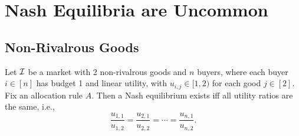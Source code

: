 \section{Nash Equilibria are Uncommon}
\label{sec:nasheq-uncommon}

\subsection{Non-Rivalrous Goods}
\label{sec:nasheq-uncommon:non-rival}

\begin{theorem}
\label{thm:nasheq-uncommon}
Let $\mathcal{I}$ be a market with 2 non-rivalrous goods and $n$ buyers, where each buyer $i \in [n]$
has budget 1 and linear utility, with $u_{i,j} \in [1, 2)$ for each good $j \in [2]$.
Fix an allocation rule $A$. Then a Nash equilibrium exists iff all utility ratios are the same, i.e.,
\[ \frac{u_{1,1}}{u_{1,2}} = \frac{u_{2,1}}{u_{2,2}} = \cdots = \frac{u_{n,1}}{u_{n,2}}. \]
\end{theorem}
